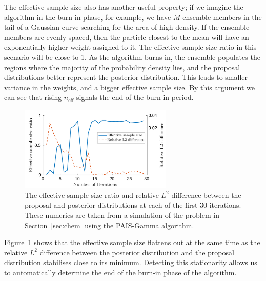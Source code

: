 \documentclass[final]{siamltex}
\newcommand{\neff}{n_{\text{eff}}}
\begin{document}
The effective sample size also has another useful property; if we
imagine the algorithm in the burn-in phase, for example, we have $M$
ensemble members in the tail of a Gaussian curve searching for the area of
high density. If the ensemble members are evenly spaced, then the particle
closest to the mean will have an exponentially higher weight assigned
to it. The effective sample size ratio in this scenario will be close to
1. As the algorithm burns in, the ensemble populates the regions where
the majority of the probability density lies, and the proposal
distributions better represent the posterior distribution. This leads
to smaller variance in the weights, and a bigger effective sample size.
By this argument we can see that rising $\neff$ signals the end of the burn-in period.

\begin{figure}[htb]
\centering
\includegraphics[width=0.65\textwidth]{"figures/C1_burnin"}
\caption{The effective sample size ratio and relative $L^2$ difference
between the proposal and posterior distributions at each of the first 30
iterations. These numerics are taken from a simulation of the problem in
Section~\ref{sec:chem} using the PAIS-Gamma algorithm.}
\label{fig:neff-burnin}
\end{figure}

Figure~\ref{fig:neff-burnin} shows that the effective sample size flattens
out at the same time as the relative $L^2$ difference between
the posterior distribution and the proposal distribution stabilises close to
its minimum. Detecting this stationarity allows us to automatically
determine the end of the burn-in phase of the algorithm.
\end{document}
